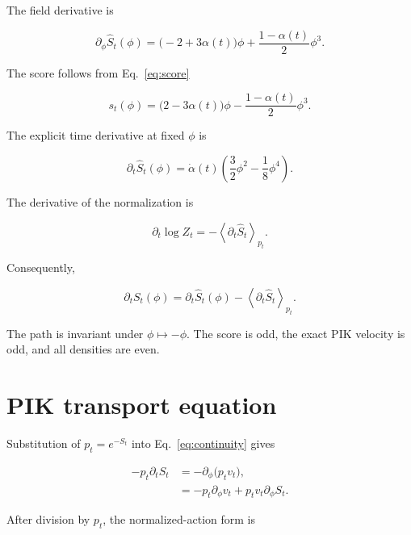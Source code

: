 \documentclass[reprint,twocolumn,superscriptaddress,preprintnumbers,amsmath,amssymb,aps,prd,floatfix]{revtex4-2}
\begin{document}
The field derivative is

\begin{equation}
 \partial_\phi\hat S_t(\phi)
 =
 \bigl(-2+3\alpha(t)\bigr)\phi
 +
 \frac{1-\alpha(t)}{2}\phi^3.
 \label{eq:action_force}
\end{equation}

The score follows from Eq.~\eqref{eq:score}

\begin{equation}
 s_t(\phi)
 =
 \bigl(2-3\alpha(t)\bigr)\phi
 -
 \frac{1-\alpha(t)}{2}\phi^3.
 \label{eq:score_explicit}
\end{equation}

The explicit time derivative at fixed $\phi$ is

\begin{equation}
 \partial_t\hat S_t(\phi)
 =
 \dot\alpha(t)
 \left(
 \frac{3}{2}\phi^2
 -
 \frac{1}{8}\phi^4
 \right).
 \label{eq:action_time_derivative}
\end{equation}

The derivative of the normalization is

\begin{equation}
 \partial_t\log Z_t
 =
 -\left\langle\partial_t\hat S_t\right\rangle_{p_t}.
 \label{eq:normalization_derivative}
\end{equation}

Consequently,

\begin{equation}
 \partial_tS_t(\phi)
 =
 \partial_t\hat S_t(\phi)
 -
 \left\langle\partial_t\hat S_t\right\rangle_{p_t}.
 \label{eq:normalized_action_time_derivative}
\end{equation}

The path is invariant under $\phi\mapsto-\phi$. The score is odd, the exact PIK velocity is odd, and all densities are even.

\section{PIK transport equation}

Substitution of $p_t=e^{-S_t}$ into Eq.~\eqref{eq:continuity} gives

\begin{align}
 -p_t\partial_tS_t
 &=
 -\partial_\phi\bigl(p_tv_t\bigr),
 \\
 &=
 -p_t\partial_\phi v_t
 +
 p_tv_t\partial_\phi S_t.
\end{align}

After division by $p_t$, the normalized-action form is
\end{document}
